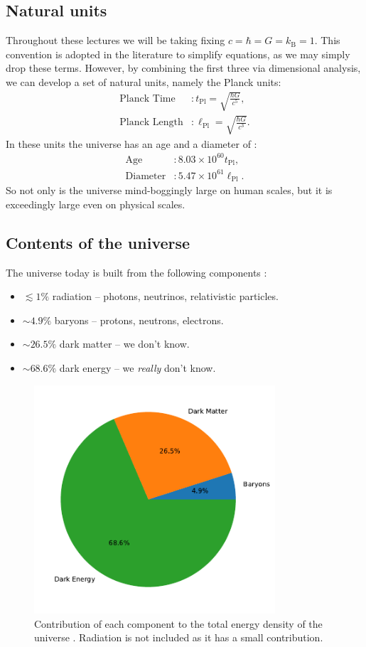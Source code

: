 \documentclass[a4paper, 12pt]{article}
\begin{document}
\subsection{Natural units}
Throughout these lectures we will be taking fixing $c=\hbar=G=k_\mathrm{B}=1$. This convention is adopted in the literature to simplify equations, as we may simply drop these terms. However, by combining the first three via dimensional analysis, we can develop a set of natural units, namely the Planck units:
\begin{align*}
    \text{Planck Time}&: t_{\mathrm{Pl}} = \sqrt{\frac{\hbar G}{c^5}},\\
    \text{Planck Length}&: \ell_{\mathrm{Pl}} = \sqrt{\frac{\hbar G}{c^3}}.
\end{align*}
In these units the universe has an age and a diameter of \cite{astropy:2022}:
\begin{align*}
    \text{Age}&: 8.03 \times 10^{60} t_{\mathrm{Pl}},\\
    \text{Diameter}&: 5.47 \times 10^{61} \ell_{\mathrm{Pl}}.
\end{align*}
So not only is the universe mind-boggingly large on human scales, but it is exceedingly large even on physical scales.

\subsection{Contents of the universe}
The universe today is built from the following components \cite{Planck_2018}:

\begin{itemize}
    \item $\lesssim 1\%$ radiation -- photons, neutrinos, relativistic particles.
    \item $\sim 4.9\%$ baryons -- protons, neutrons, electrons.
    \item $\sim 26.5\%$ dark matter -- we don't know.
    \item $\sim 68.6\%$ dark energy -- we \textit{really} don't know.
\end{itemize}

\begin{figure}
    \centering
    \includegraphics[width=0.8\textwidth]{universal_pie.pdf}
    \caption{Contribution of each component to the total energy density of the universe \cite{Planck_2018}. Radiation is not included as it has a small contribution.}
\end{figure}


\end{document}
